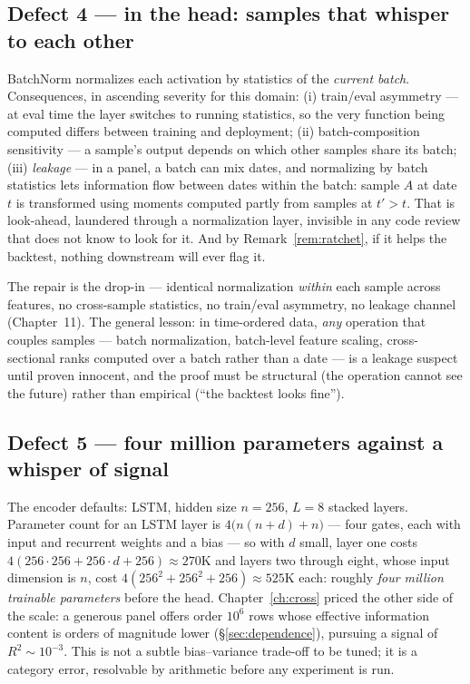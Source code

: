 \subsection*{Defect 4 ---  in the head: samples that
whisper to each other}

BatchNorm normalizes each activation by statistics of the \emph{current
batch}. Consequences, in ascending severity for this domain: (i)
train/eval asymmetry --- at eval time the layer switches to running
statistics, so the very function being computed differs between training
and deployment; (ii) batch-composition sensitivity --- a sample's output
depends on which other samples share its batch; (iii) \emph{leakage} ---
in a panel, a batch can mix dates, and normalizing by batch statistics lets
information flow between dates within the batch: sample $A$ at date $t$ is
transformed using moments computed partly from samples at $t' > t$. That is
look-ahead, laundered through a normalization layer, invisible in any code
review that does not know to look for it. And by
Remark~\ref{rem:ratchet}, if it helps the backtest, nothing downstream
will ever flag it.

The repair is the drop-in  --- identical normalization
\emph{within} each sample across features, no cross-sample statistics, no
train/eval asymmetry, no leakage channel (Chapter~11). The general lesson:
in time-ordered data, \emph{any} operation that couples samples --- batch
normalization, batch-level feature scaling, cross-sectional ranks computed
over a batch rather than a date --- is a leakage suspect until proven
innocent, and the proof must be structural (the operation cannot see the
future) rather than empirical (``the backtest looks fine'').

\subsection*{Defect 5 --- four million parameters against a whisper of
signal}

The encoder defaults: LSTM, hidden size $n = 256$, $L = 8$ stacked layers.
Parameter count for an LSTM layer is $4\bigl(n(n + d) + n\bigr)$ --- four
gates, each with input and recurrent weights and a bias --- so with $d$
small, layer one costs $4(256 \cdot 256 + 256 \cdot d + 256) \approx 270$K
and layers two through eight, whose input dimension is $n$, cost
$4(256^2 + 256^2 + 256) \approx 525$K each: roughly \emph{four million
trainable parameters} before the head. Chapter~\ref{ch:cross} priced the
other side of the scale: a generous panel offers order $10^6$ rows whose
effective information content is orders of magnitude lower
(\S\ref{sec:dependence}), pursuing a signal of $R^2 \sim 10^{-3}$. This is
not a subtle bias--variance trade-off to be tuned; it is a category error,
resolvable by arithmetic before any experiment is run.

